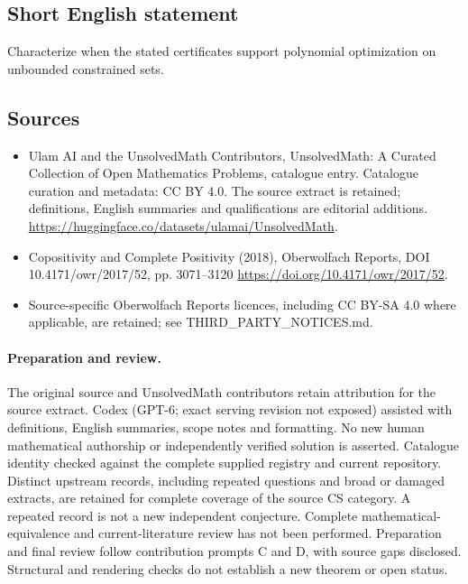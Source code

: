 \documentclass[11pt]{article}
\begin{document}
\subsection{Short English statement}
Characterize when the stated certificates support polynomial optimization on unbounded constrained sets.
\subsection{Sources}
\begin{itemize}
\item[\hypertarget{source:statement:1}{S1}] Ulam AI and the UnsolvedMath Contributors, UnsolvedMath: A Curated Collection of Open Mathematics Problems, catalogue entry. Catalogue curation and metadata: CC BY 4.0. The source extract is retained; definitions, English summaries and qualifications are editorial additions.
\url{https://huggingface.co/datasets/ulamai/UnsolvedMath}.
\item[\hypertarget{source:statement:2}{S2}] Copositivity and Complete Positivity (2018), Oberwolfach Reports, DOI 10.4171/owr/2017/52, pp. 3071--3120
\url{https://doi.org/10.4171/owr/2017/52}.
\item Source-specific Oberwolfach Reports licences, including CC BY-SA 4.0 where applicable, are retained; see THIRD\_PARTY\_NOTICES.md.
\end{itemize}
\paragraph{Preparation and review.}
The original source and UnsolvedMath contributors retain attribution for the source extract. Codex (GPT-6; exact serving revision not exposed) assisted with definitions, English summaries, scope notes and formatting. No new human mathematical authorship or independently verified solution is asserted. Catalogue identity checked against the complete supplied registry and current repository. Distinct upstream records, including repeated questions and broad or damaged extracts, are retained for complete coverage of the source CS category. A repeated record is not a new independent conjecture. Complete mathematical-equivalence and current-literature review has not been performed. Preparation and final review follow contribution prompts C and D, with source gaps disclosed. Structural and rendering checks do not establish a new theorem or open status.
\label{end:statement}
\end{document}
